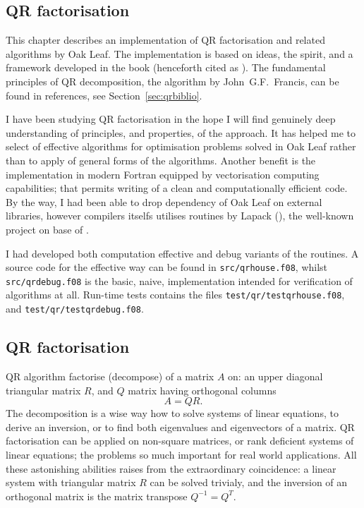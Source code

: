 \begin{refsection}
\chapter{QR factorisation}

This chapter describes an implementation of QR factorisation and related
algorithms by Oak Leaf.
The implementation is based on ideas, the spirit, and
a framework developed in the book 
(henceforth cited as \cite{golub2013matrix}).
The fundamental principles of QR decomposition, the algorithm
by John~G.F.~Francis,
can be found in references, see Section~\ref{sec:qrbiblio}.

I have been studying QR factorisation in the hope I will find
genuinely deep understanding of principles, and properties, of the approach.
It has helped me to select of effective algorithms for optimisation problems
solved in Oak Leaf
rather than to apply of general forms of the algorithms.
Another benefit is the implementation in modern Fortran
equipped by vectorisation computing capabilities;
that permits writing of a clean and computationally efficient code.
By the way, I had been able to drop dependency of Oak Leaf on external libraries,
however compilers itselfs utilises routines by Lapack
(), the well-known project on base
of \cite{golub2013matrix}.

I had developed both computation effective and debug variants of the routines.
A source code for the effective way can be found
in \texttt{src/qrhouse.f08}, whilst \texttt{src/qrdebug.f08}
is the basic, naive, implementation intended for verification of algorithms
at all. Run-time tests contains the files \texttt{test/qr/testqrhouse.f08},
and \texttt{test/qr/testqrdebug.f08}.

\section{QR factorisation}
\label{sec:qrfactorisation}

QR algorithm factorise (decompose) of a matrix $A$ on:
an upper diagonal triangular matrix $R$, and $Q$ matrix
having orthogonal columns
\begin{equation}
  A = Q R.
\end{equation}
The decomposition is a wise way how to solve systems of linear equations,
to derive an inversion, or to find both eigenvalues and eigenvectors
of a matrix. QR factorisation can be applied on non-square matrices,
or rank deficient systems of linear equations;
the problems so much important for real world applications.
All these astonishing abilities raises from the extraordinary coincidence:
a linear system with triangular matrix $R$ can be solved trivialy, and
the inversion of an orthogonal matrix is the matrix transpose $Q^{-1} = Q^T$.


\end{refsection}
